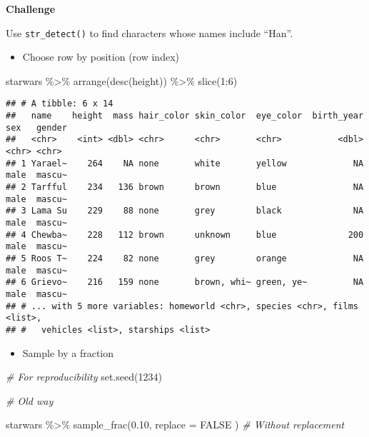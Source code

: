 \documentclass[
]{book}
\newenvironment{Shaded}{\begin{snugshade}}{\end{snugshade}}
\newcommand{\AttributeTok}[1]{\textcolor[rgb]{0.77,0.63,0.00}{#1}}
\newcommand{\CommentTok}[1]{\textcolor[rgb]{0.56,0.35,0.01}{\textit{#1}}}
\newcommand{\ConstantTok}[1]{\textcolor[rgb]{0.00,0.00,0.00}{#1}}
\newcommand{\DecValTok}[1]{\textcolor[rgb]{0.00,0.00,0.81}{#1}}
\newcommand{\FloatTok}[1]{\textcolor[rgb]{0.00,0.00,0.81}{#1}}
\newcommand{\FunctionTok}[1]{\textcolor[rgb]{0.00,0.00,0.00}{#1}}
\newcommand{\NormalTok}[1]{#1}
\newcommand{\SpecialCharTok}[1]{\textcolor[rgb]{0.00,0.00,0.00}{#1}}
\providecommand{\tightlist}{%
  \setlength{\itemsep}{0pt}\setlength{\parskip}{0pt}}
\begin{document}
\textbf{Challenge}

Use \texttt{str\_detect()} to find characters whose names include ``Han''.

\begin{itemize}
\tightlist
\item
  Choose row by position (row index)
\end{itemize}

\begin{Shaded}
\begin{Highlighting}[]
\NormalTok{starwars }\SpecialCharTok{\%\textgreater{}\%}
  \FunctionTok{arrange}\NormalTok{(}\FunctionTok{desc}\NormalTok{(height)) }\SpecialCharTok{\%\textgreater{}\%}
  \FunctionTok{slice}\NormalTok{(}\DecValTok{1}\SpecialCharTok{:}\DecValTok{6}\NormalTok{)}
\end{Highlighting}
\end{Shaded}

\begin{verbatim}
## # A tibble: 6 x 14
##   name    height  mass hair_color skin_color  eye_color  birth_year sex   gender
##   <chr>    <int> <dbl> <chr>      <chr>       <chr>           <dbl> <chr> <chr> 
## 1 Yarael~    264    NA none       white       yellow             NA male  mascu~
## 2 Tarfful    234   136 brown      brown       blue               NA male  mascu~
## 3 Lama Su    229    88 none       grey        black              NA male  mascu~
## 4 Chewba~    228   112 brown      unknown     blue              200 male  mascu~
## 5 Roos T~    224    82 none       grey        orange             NA male  mascu~
## 6 Grievo~    216   159 none       brown, whi~ green, ye~         NA male  mascu~
## # ... with 5 more variables: homeworld <chr>, species <chr>, films <list>,
## #   vehicles <list>, starships <list>
\end{verbatim}

\begin{itemize}
\tightlist
\item
  Sample by a fraction
\end{itemize}

\begin{Shaded}
\begin{Highlighting}[]
\CommentTok{\# For reproducibility}
\FunctionTok{set.seed}\NormalTok{(}\DecValTok{1234}\NormalTok{)}

\CommentTok{\# Old way}

\NormalTok{starwars }\SpecialCharTok{\%\textgreater{}\%}
  \FunctionTok{sample\_frac}\NormalTok{(}\FloatTok{0.10}\NormalTok{,}
    \AttributeTok{replace =} \ConstantTok{FALSE}
\NormalTok{  ) }\CommentTok{\# Without replacement}
\end{Highlighting}
\end{Shaded}
\end{document}
